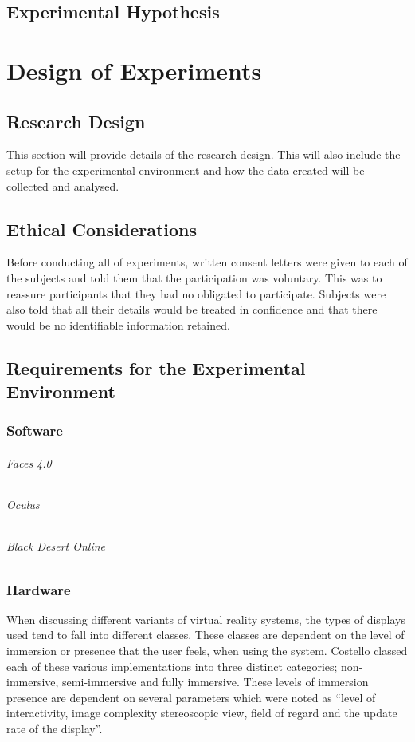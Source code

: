 \documentclass[12pt]{report}
\begin{document}
\section{Experimental Hypothesis}
 
\chapter{Design of Experiments}
\section{Research Design}
This section will provide details of the research design. This will also include the setup for the experimental environment and how the data created will be collected and analysed. 

\section{Ethical Considerations}
Before conducting all of experiments, written consent letters were given to each of the subjects and told them that the participation was voluntary. This was to reassure participants that they had no obligated to participate. Subjects were also told that all their details would be treated in confidence and that there would be no identifiable information retained.

\section{Requirements for the Experimental Environment}

\subsection{Software}
\subparagraph{Faces 4.0}
\subparagraph{Oculus}
\subparagraph{Black Desert Online}


\subsection{Hardware}
When discussing different variants of virtual reality systems, the types of displays used tend to fall into different classes. These classes are dependent on the level of immersion or presence that the user feels, when using the system. Costello  classed each of these various implementations into three distinct categories; non-immersive, semi-immersive and fully immersive. These levels of immersion presence are dependent on several parameters which were noted as “level of interactivity, image complexity stereoscopic view, field of regard and the update rate of the display”.
\\
\end{document}

